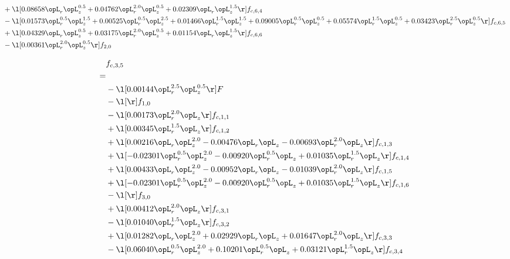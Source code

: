 \begin{alignat}{2}
& + \l[  0.08658 \opL_r \opL_z^{0.5} +  0.04762 \opL_r^{2.0} \opL_z^{0.5} +  0.02309 \opL_r \opL_z^{1.5}  \r] f_{c,6,4} \nonumber \\ 
& - \l[  0.01573 \opL_r^{0.5} \opL_z^{1.5} +  0.00525 \opL_r^{0.5} \opL_z^{2.5} +  0.01466 \opL_r^{1.5} \opL_z^{1.5} +  0.09005 \opL_r^{0.5} \opL_z^{0.5} +  0.05574 \opL_r^{1.5} \opL_z^{0.5} +  0.03423 \opL_r^{2.5} \opL_z^{0.5}  \r] f_{c,6,5} \nonumber \\ 
& + \l[  0.04329 \opL_r \opL_z^{0.5} +  0.03175 \opL_r^{2.0} \opL_z^{0.5} +  0.01154 \opL_r \opL_z^{1.5}  \r] f_{c,6,6} \nonumber \\ 
& - \l[  0.00361 \opL_r^{2.0} \opL_z^{0.5}  \r] f_{2,0} \nonumber \\ 
\end{alignat} 


\begin{alignat}{2} 
\label{eq:f_35_1} 
& f_{c,3,5} \nonumber \\ 
 = \\ 
& - \l[  0.00144 \opL_r^{2.5} \opL_z^{0.5}  \r] F \nonumber \\ 
& - \l[  \r] f_{1,0} \nonumber \\ 
& - \l[  0.00173 \opL_r^{2.0} \opL_z  \r] f_{c,1,1} \nonumber \\ 
& + \l[  0.00345 \opL_r^{1.5} \opL_z  \r] f_{c,1,2} \nonumber \\ 
& + \l[  0.00216 \opL_r \opL_z^{2.0}   -0.00476 \opL_r \opL_z   -0.00693 \opL_r^{2.0} \opL_z  \r] f_{c,1,3} \nonumber \\ 
& + \l[  -0.02301 \opL_r^{0.5} \opL_z^{2.0}   -0.00920 \opL_r^{0.5} \opL_z +  0.01035 \opL_r^{1.5} \opL_z  \r] f_{c,1,4} \nonumber \\ 
& + \l[  0.00433 \opL_r \opL_z^{2.0}   -0.00952 \opL_r \opL_z   -0.01039 \opL_r^{2.0} \opL_z  \r] f_{c,1,5} \nonumber \\ 
& + \l[  -0.02301 \opL_r^{0.5} \opL_z^{2.0}   -0.00920 \opL_r^{0.5} \opL_z +  0.01035 \opL_r^{1.5} \opL_z  \r] f_{c,1,6} \nonumber \\ 
& - \l[  \r] f_{3,0} \nonumber \\ 
& + \l[  0.00412 \opL_r^{2.0} \opL_z  \r] f_{c,3,1} \nonumber \\ 
& - \l[  0.01040 \opL_r^{1.5} \opL_z  \r] f_{c,3,2} \nonumber \\ 
& + \l[  0.01282 \opL_r \opL_z^{2.0} +  0.02929 \opL_r \opL_z +  0.01647 \opL_r^{2.0} \opL_z  \r] f_{c,3,3} \nonumber \\ 
& - \l[  0.06040 \opL_r^{0.5} \opL_z^{2.0} +  0.10201 \opL_r^{0.5} \opL_z +  0.03121 \opL_r^{1.5} \opL_z  \r] f_{c,3,4} \nonumber \\ 

\end{alignat}

